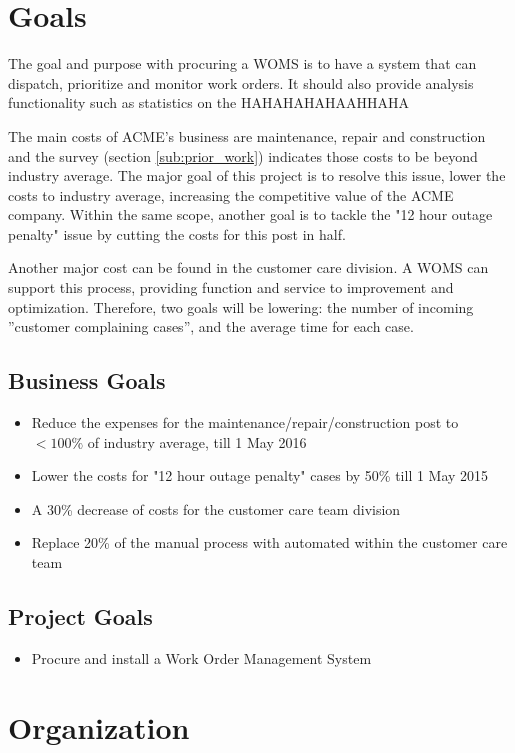 \documentclass[a4paper]{article}
\begin{document}
\section{Goals} 
\label{sec:goals}
The goal and purpose with procuring a WOMS is to have a system that can dispatch, prioritize and monitor work orders. It should also provide analysis functionality such as statistics on the  HAHAHAHAHAAHHAHA

The main costs of ACME's business are maintenance, repair and construction and the survey (section \ref{sub:prior_work}) indicates those costs to be beyond industry average. The major goal of this project is to resolve this issue, lower the costs to industry average, increasing the competitive value of the ACME company. Within the same scope, another goal is to tackle the "12 hour outage penalty" issue by cutting the costs for this post in half. 

Another major cost can be found in the customer care division. A WOMS can support this process, providing function and service to improvement and optimization. Therefore, two goals will be lowering: the number of incoming ''customer complaining cases'', and the average time for each case.
\subsection{Business Goals}
\begin{itemize}
\item Reduce the expenses for the maintenance/repair/construction post to $<100\%$ of industry average, till 1 May 2016
\item Lower the costs for "12 hour outage penalty" cases by 50\% till 1 May 2015
\item A 30\% decrease of costs for the customer care team division
\item Replace 20\% of the manual process with automated within the customer care team
\end{itemize}

\subsection{Project Goals}
\begin{itemize}
\item Procure and install a Work Order Management System
\end{itemize}

\section{Organization}
\label{sec:organization}
\end{document}
